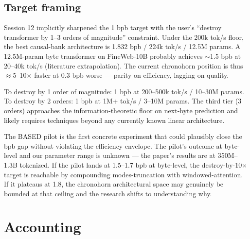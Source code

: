 \subsection{Target framing}

Session 12 implicitly sharpened the 1 bpb target with the user's ``destroy transformer by 1--3 orders of magnitude'' constraint. Under the 200k tok/s floor, the best causal-bank architecture is 1.832 bpb / 224k tok/s / 12.5M params. A 12.5M-param byte transformer on FineWeb-10B probably achieves $\sim$1.5 bpb at 20--40k tok/s (literature extrapolation). The current chronohorn position is thus $\approx$5--10$\times$ faster at 0.3 bpb worse --- parity on efficiency, lagging on quality.

To destroy by 1 order of magnitude: 1 bpb at 200--500k tok/s / 10--30M params. To destroy by 2 orders: 1 bpb at 1M+ tok/s / 3--10M params. The third tier (3 orders) approaches the information-theoretic floor on next-byte prediction and likely requires techniques beyond any currently known linear architecture.

The BASED pilot is the first concrete experiment that could plausibly close the bpb gap without violating the efficiency envelope. The pilot's outcome at byte-level and our parameter range is unknown --- the paper's results are at 350M--1.3B tokenized. If the pilot lands at 1.5--1.7 bpb at byte-level, the destroy-by-10$\times$ target is reachable by compounding modes-truncation with windowed-attention. If it plateaus at 1.8, the chronohorn architectural space may genuinely be bounded at that ceiling and the research shifts to understanding why.

\section{Accounting}

